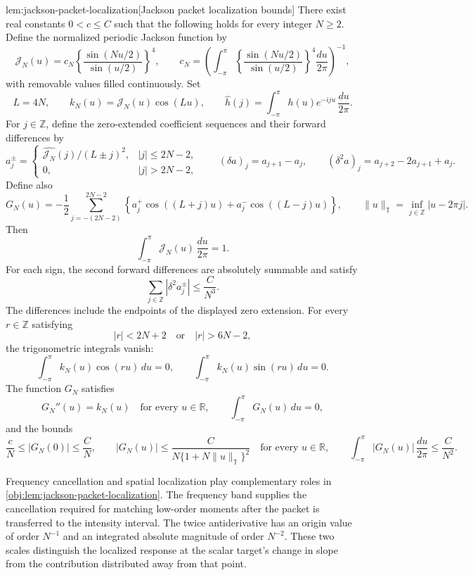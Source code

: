 \begin{lemmav}{lem:jackson-packet-localization}[Jackson packet localization bounds]
There exist real constants \(0<c\leq C\) such that the following holds for every integer \(N\geq2\). Define the normalized periodic Jackson function by
\[
\mathcal J_N(u)
=c_N\left\{\frac{\sin(Nu/2)}{\sin(u/2)}\right\}^{4},
\qquad
c_N=
\left(
\int_{-\pi}^{\pi}
\left\{\frac{\sin(Nu/2)}{\sin(u/2)}\right\}^{4}
\frac{du}{2\pi}
\right)^{-1},
\]
with removable values filled continuously. Set
\[
L=4N,\qquad
k_N(u)=\mathcal J_N(u)\cos(Lu),
\qquad
\widehat h(j)=\int_{-\pi}^{\pi}h(u)e^{-iju}\,\frac{du}{2\pi}.
\]
For \(j\in\mathbb Z\), define the zero-extended coefficient sequences and their forward differences by
\[
a_j^\pm=
\begin{cases}
\widehat{\mathcal J_N}(j)/(L\pm j)^2,& |j|\leq2N-2,\\
0,& |j|>2N-2,
\end{cases}
\qquad
(\delta a)_j=a_{j+1}-a_j,
\qquad
(\delta^2a)_j=a_{j+2}-2a_{j+1}+a_j.
\]
Define also
\[
G_N(u)
=-\frac12\sum_{j=-(2N-2)}^{2N-2}
\left\{
a_j^+\cos((L+j)u)+a_j^-\cos((L-j)u)
\right\},
\qquad
\|u\|_{\mathbb T}
=\inf_{j\in\mathbb Z}|u-2\pi j|.
\]
Then
\[
\int_{-\pi}^{\pi}\mathcal J_N(u)\,\frac{du}{2\pi}=1.
\]
For each sign, the second forward differences are absolutely summable and satisfy
\[
\sum_{j\in\mathbb Z}|\delta^2a_j^\pm|
\leq\frac{C}{N^3}.
\]
The differences include the endpoints of the displayed zero extension. For every \(r\in\mathbb Z\) satisfying
\[
|r|<2N+2\quad\text{or}\quad |r|>6N-2,
\]
the trigonometric integrals vanish:
\[
\int_{-\pi}^{\pi}k_N(u)\cos(ru)\,du=0,
\qquad
\int_{-\pi}^{\pi}k_N(u)\sin(ru)\,du=0.
\]
The function \(G_N\) satisfies
\[
G_N''(u)=k_N(u)\quad\text{for every }u\in\mathbb R,
\qquad
\int_{-\pi}^{\pi}G_N(u)\,du=0,
\]
and the bounds
\[
\frac{c}{N}\leq |G_N(0)|\leq\frac{C}{N},
\qquad
|G_N(u)|\leq
\frac{C}{N\{1+N\|u\|_{\mathbb T}\}^{2}}
\quad\text{for every }u\in\mathbb R,
\qquad
\int_{-\pi}^{\pi}|G_N(u)|\,\frac{du}{2\pi}
\leq\frac{C}{N^2}.
\]
\end{lemmav}

Frequency cancellation and spatial localization play complementary roles in \cref{obj:lem:jackson-packet-localization}. The frequency band supplies the cancellation required for matching low-order moments after the packet is transferred to the intensity interval. The twice antiderivative has an origin value of order \(N^{-1}\) and an integrated absolute magnitude of order \(N^{-2}\). These two scales distinguish the localized response at the scalar target's change in slope from the contribution distributed away from that point.

